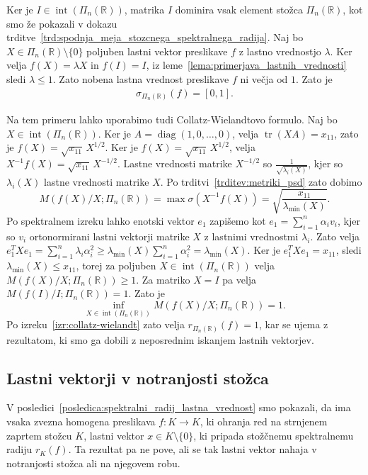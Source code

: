 \documentclass[mat2, tisk]{fmfdelo}
\newcommand{\R}{\mathbb{R}}
\begin{document}
\begin{zgled}
  Ker je $I\in\operatorname{int}(\Pi_n(\R))$, matrika $I$ dominira vsak
  element stožca $\Pi_n(\R)$, kot smo že pokazali v dokazu trditve~\ref{trd:spodnja_meja_stozcnega_spektralnega_radija}. 
  Naj bo $X\in\Pi_n(\R)\setminus\{0\}$ poljuben
  lastni vektor preslikave $f$ z lastno vrednostjo $\lambda$. Ker velja
  $f(X)=\lambda X$ in $f(I)=I$, iz leme~\ref{lema:primerjava_lastnih_vrednosti} sledi $\lambda\leq1$.
  Zato nobena lastna vrednost preslikave $f$ ni večja od $1$. Zato je
  \begin{align*}
  \sigma_{\Pi_n(\R)}(f)=[0,1].
  \end{align*}

  Na tem primeru lahko uporabimo tudi Collatz-Wielandtovo formulo.
  Naj bo $X\in\operatorname{int}(\Pi_n(\R))$. Ker je
  $A=\operatorname{diag}(1,0,\ldots,0)$, velja
  $\operatorname{tr}(XA)=x_{11}$, zato je
  $f(X)=\sqrt{x_{11}}\,X^{1/2}$. 
  Ker je $f(X)=\sqrt{x_{11}}\,X^{1/2}$, velja
  $X^{-1}f(X)=\sqrt{x_{11}}\,X^{-1/2}$.
  Lastne vrednosti matrike $X^{-1/2}$ so
  $\frac{1}{\sqrt{\lambda_i(X)}}$, kjer so
  $\lambda_i(X)$ lastne vrednosti matrike $X$.
  Po trditvi~\ref{trditev:metriki_psd} zato dobimo
  \[
  M(f(X)/X;\Pi_n(\R))
  =\max\sigma(X^{-1}f(X))
  =\sqrt{\frac{x_{11}}{\lambda_{\min}(X)}}.
  \]
  Po spektralnem izreku lahko enotski vektor $e_1$ zapišemo kot
  $e_1=\sum\limits_{i=1}^n\alpha_i v_i$, kjer so $v_i$ ortonormirani lastni
  vektorji matrike $X$ z lastnimi vrednostmi $\lambda_i$. Zato velja
  $e_1^TXe_1=\sum\limits_{i=1}^n\lambda_i\alpha_i^2
  \geq\lambda_{\min}(X)\sum\limits_{i=1}^n\alpha_i^2
  =\lambda_{\min}(X)$.
  Ker je $e_1^TXe_1=x_{11}$, sledi
  $\lambda_{\min}(X)\leq x_{11}$, torej za poljuben $X\in\operatorname{int}(\Pi_n(\R))$ velja
  $M(f(X)/X;\Pi_n(\R))\geq1$. Za matriko $X=I$ pa velja
  $M(f(I)/I;\Pi_n(\R))=1$. Zato je
  \[
  \inf\limits_{X\in\operatorname{int}(\Pi_n(\R))}
  M(f(X)/X;\Pi_n(\R))=1.
  \]
  Po izreku~\ref{izr:collatz-wielandt} zato velja
  $r_{\Pi_n(\R)}(f)=1$, kar se ujema z rezultatom, ki smo ga dobili z neposrednim iskanjem lastnih vektorjev.
\end{zgled}







\subsection{Lastni vektorji v notranjosti stožca}

V posledici~\ref{posledica:spektralni_radij_lastna_vrednost} smo
pokazali, da ima vsaka zvezna homogena preslikava
$f:K\longrightarrow K$, ki ohranja red na strnjenem zaprtem stožcu
$K$, lastni vektor $x\in K\setminus\{0\}$, ki pripada stožčnemu
spektralnemu radiju $r_K(f)$. Ta rezultat pa ne pove, ali se tak lastni
vektor nahaja v notranjosti stožca ali na njegovem robu.
\end{document}
